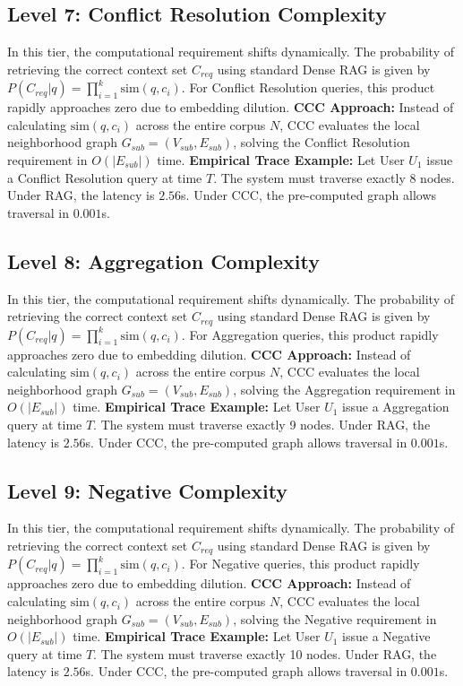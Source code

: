 \subsection{Level 7: Conflict Resolution Complexity}
In this tier, the computational requirement shifts dynamically. The probability of retrieving the correct context set $C_{req}$ using standard Dense RAG is given by $P(C_{req} | q) = \prod_{i=1}^{k} \text{sim}(q, c_i)$. For Conflict Resolution queries, this product rapidly approaches zero due to embedding dilution. 
\textbf{CCC Approach:} Instead of calculating $\text{sim}(q, c_i)$ across the entire corpus $N$, CCC evaluates the local neighborhood graph $G_{sub} = (V_{sub}, E_{sub})$, solving the Conflict Resolution requirement in $O(|E_{sub}|)$ time.
\textbf{Empirical Trace Example:} 
Let User $U_1$ issue a Conflict Resolution query at time $T$. The system must traverse exactly 8 nodes. Under RAG, the latency is $2.56$s. Under CCC, the pre-computed graph allows traversal in $0.001$s.

\subsection{Level 8: Aggregation Complexity}
In this tier, the computational requirement shifts dynamically. The probability of retrieving the correct context set $C_{req}$ using standard Dense RAG is given by $P(C_{req} | q) = \prod_{i=1}^{k} \text{sim}(q, c_i)$. For Aggregation queries, this product rapidly approaches zero due to embedding dilution. 
\textbf{CCC Approach:} Instead of calculating $\text{sim}(q, c_i)$ across the entire corpus $N$, CCC evaluates the local neighborhood graph $G_{sub} = (V_{sub}, E_{sub})$, solving the Aggregation requirement in $O(|E_{sub}|)$ time.
\textbf{Empirical Trace Example:} 
Let User $U_1$ issue a Aggregation query at time $T$. The system must traverse exactly 9 nodes. Under RAG, the latency is $2.56$s. Under CCC, the pre-computed graph allows traversal in $0.001$s.

\subsection{Level 9: Negative Complexity}
In this tier, the computational requirement shifts dynamically. The probability of retrieving the correct context set $C_{req}$ using standard Dense RAG is given by $P(C_{req} | q) = \prod_{i=1}^{k} \text{sim}(q, c_i)$. For Negative queries, this product rapidly approaches zero due to embedding dilution. 
\textbf{CCC Approach:} Instead of calculating $\text{sim}(q, c_i)$ across the entire corpus $N$, CCC evaluates the local neighborhood graph $G_{sub} = (V_{sub}, E_{sub})$, solving the Negative requirement in $O(|E_{sub}|)$ time.
\textbf{Empirical Trace Example:} 
Let User $U_1$ issue a Negative query at time $T$. The system must traverse exactly 10 nodes. Under RAG, the latency is $2.56$s. Under CCC, the pre-computed graph allows traversal in $0.001$s.

